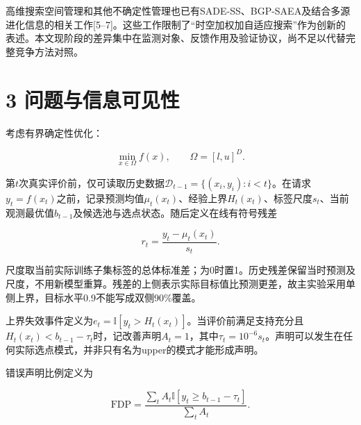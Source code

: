 \documentclass[11pt,a4paper]{article}
\begin{document}
高维搜索空间管理和其他不确定性管理也已有SADE-SS、BGP-SAEA及结合多源进化信息的相关工作{[}5--7{]}。这些工作限制了``时空加权加自适应搜索''作为创新的表述。本文现阶段的差异集中在监测对象、反馈作用及验证协议，尚不足以代替完整竞争方法对照。

\par{}\noindent\begin{minipage}{\linewidth}

\hypertarget{ux95eeux9898ux4e0eux4fe1ux606fux53efux89c1ux6027}{%
\section{3
问题与信息可见性}\label{ux95eeux9898ux4e0eux4fe1ux606fux53efux89c1ux6027}}

考虑有界确定性优化：

\[
\min_{x\in\Omega} f(x),\qquad \Omega=[l,u]^D.
\]

\end{minipage}\par

\par\noindent\begin{minipage}{\linewidth}

第\(t\)次真实评价前，仅可读取历史数据\(\mathcal D_{t-1}=\{(x_i,y_i):i<t\}\)。在请求\(y_t=f(x_t)\)之前，记录预测均值\(\mu_t(x_t)\)、经验上界\(H_t(x_t)\)、标签尺度\(s_t\)、当前观测最优值\(b_{t-1}\)及候选池与选点状态。随后定义在线有符号残差

\[
r_t=\frac{y_t-\mu_t(x_t)}{s_t}.
\]

\end{minipage}\par

尺度取当前实际训练子集标签的总体标准差；为0时置1。历史残差保留当时预测及尺度，不用新模型重算。残差的上侧表示实际目标值比预测更差，故主实验采用单侧上界，目标水平0.9不能写成双侧90\%覆盖。

上界失效事件定义为\(e_t=\mathbb I[y_t>H_t(x_t)]\)。当评价前满足支持充分且\(H_t(x_t)<b_{t-1}-\tau_t\)时，记改善声明\(A_t=1\)，其中\(\tau_t=10^{-6}s_t\)。声明可以发生在任何实际选点模式，并非只有名为upper的模式才能形成声明。

\par\noindent\begin{minipage}{\linewidth}

错误声明比例定义为

\[
\mathrm{FDP}=\frac{\sum_t A_t\mathbb I[y_t\ge b_{t-1}-\tau_t]}{\sum_t A_t}.
\]

\end{minipage}\par
\end{document}
